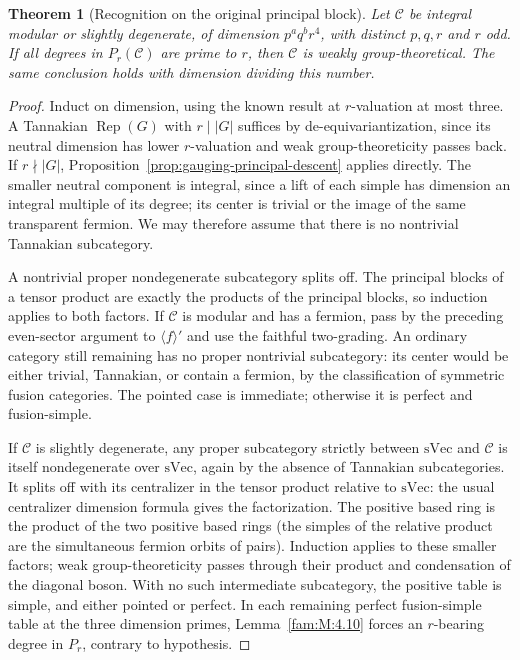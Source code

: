 \documentclass[11pt,a4paper]{article}
\numberwithin{equation}{section}
\newtheorem{theorem}{Theorem}[section]
\theoremstyle{remark}
\begin{document}
\begin{theorem}[Recognition on the original principal block]\label{fam:Q:8.1}\label{fam:Q:n:quart:recognition}
Let $\mathcal C$ be integral modular or slightly degenerate, of
dimension $p^a q^b r^4$, with distinct $p,q,r$ and $r$ odd. If all
degrees in $P_r(\mathcal C)$ are prime to $r$, then $\mathcal C$ is
weakly group-theoretical. The same conclusion holds with dimension
dividing this number.

\end{theorem}
\begin{proof}
Induct on dimension, using the known result at $r$-valuation at most
three. A Tannakian $\operatorname{Rep}(G)$ with $r\mid |G|$ suffices
by de-equivariantization, since its neutral dimension has lower
$r$-valuation and weak group-theoreticity passes back. If $r\nmid |G|$,
Proposition~\ref{prop:gauging-principal-descent} applies directly. The smaller
neutral component is integral, since a lift of each simple has
dimension an integral multiple of its degree; its center is trivial or
the image of the same transparent fermion. We may therefore assume
that there is no nontrivial Tannakian subcategory.

A nontrivial proper nondegenerate subcategory splits off. The
principal blocks of a tensor product are exactly the products of
the principal blocks, so induction applies to both factors. If
$\mathcal C$ is modular and has a fermion, pass by the preceding
even-sector argument to $\langle f\rangle'$ and use the faithful
two-grading. An ordinary category still remaining has no proper
nontrivial subcategory: its center would be either trivial,
Tannakian, or contain a fermion, by the classification of symmetric
fusion categories. The pointed case is immediate; otherwise it is
perfect and fusion-simple.

If $\mathcal C$ is slightly degenerate, any proper subcategory
strictly between $\mathrm{sVec}$ and $\mathcal C$ is itself
nondegenerate over $\mathrm{sVec}$, again by the absence of Tannakian
subcategories. It splits off with its centralizer in the tensor product
relative to $\mathrm{sVec}$: the usual centralizer dimension formula
gives the factorization. The positive based ring is the product of
the two positive based rings (the simples of the relative product
are the simultaneous fermion orbits of pairs). Induction applies
to these smaller factors; weak group-theoreticity passes through their
product and condensation of the diagonal boson. With no such
intermediate subcategory, the positive table is simple, and either
pointed or perfect. In each remaining perfect fusion-simple table
at the three dimension primes, Lemma~\ref{fam:M:4.10} forces an $r$-bearing degree in $P_r$, contrary to hypothesis.

\end{proof}
\end{document}
